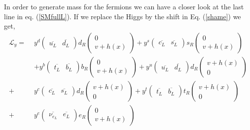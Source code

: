 In order to generate mass for the fermions we can have a closer look at the last line in eq. (\ref{SMfullL}). If we replace the Higgs by the shift in Eq. (\ref{shame}) we get, 
%
\begin{align}
\mathcal{L}_y = \, \, & y^d 
\begin{pmatrix}
\overline{u_L} & \overline{d_L} 
\end{pmatrix} d_R 
\begin{pmatrix}
0\\ v + h(x)
\end{pmatrix}  + 
y^s 
\begin{pmatrix}
\overline{c_L} & \overline{s_L} 
\end{pmatrix} s_R 
\begin{pmatrix}
0 \\ v + h(x)
\end{pmatrix} \nonumber  \\ & +
 y^b 
\begin{pmatrix}
\overline{t_L} & \overline{b_L} 
\end{pmatrix} b_R 
\begin{pmatrix}
0 \\ v + h(x)
\end{pmatrix}  +
 y^u 
\begin{pmatrix}
\overline{u_L} & \overline{d_L} 
\end{pmatrix} d_R 
\begin{pmatrix}
v + h(x) \\ 0
\end{pmatrix} \nonumber \\ + &   y^c 
\begin{pmatrix}
\overline{c_L} & \overline{s_L} 
\end{pmatrix} d_R 
\begin{pmatrix}
v + h(x) \\ 0 
\end{pmatrix} +
y^t
\begin{pmatrix}
\overline{t_L} & \overline{b_L} 
\end{pmatrix} t_R \begin{pmatrix}
 v + h(x) \\ 0
\end{pmatrix}   \\ + &  y^e 
\begin{pmatrix}
\overline{\nu_{e_L}} & \overline{e_L} 
\end{pmatrix} e_R 
\begin{pmatrix}
0 \\ v + h(x)

\end{pmatrix}
\end{align}
